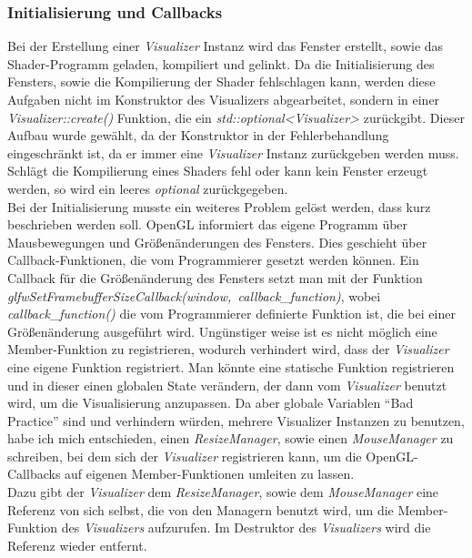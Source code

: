 \documentclass[11pt,a4paper]{article}
\begin{document}
\subsubsection*{Initialisierung und Callbacks}
Bei der Erstellung einer \mbox{\textit{Visualizer}} Instanz wird das Fenster erstellt, sowie das Shader-Programm geladen, kompiliert und gelinkt. Da die Initialisierung des Fensters, sowie die Kompilierung der Shader fehlschlagen kann, werden diese Aufgaben nicht im Konstruktor des Visualizers abgearbeitet, sondern in einer \mbox{\textit{Visualizer::create()}} Funktion, die ein \mbox{\textit{std::optional<Visualizer>}} zurückgibt. Dieser Aufbau wurde gewählt, da der Konstruktor in der Fehlerbehandlung eingeschränkt ist, da er immer eine \mbox{\textit{Visualizer}} Instanz zurückgeben werden muss. Schlägt die Kompilierung eines Shaders fehl oder kann kein Fenster erzeugt werden, so wird ein leeres \mbox{\textit{optional}} zurückgegeben.\\
Bei der Initialisierung musste ein weiteres Problem gelöst werden, dass kurz beschrieben werden soll. OpenGL informiert das eigene Programm über Mausbewegungen und Größenänderungen des Fensters. Dies geschieht über Callback-Funktionen, die vom Programmierer gesetzt werden können. Ein Callback für die Größenänderung des Fensters setzt man mit der Funktion \mbox{\textit{glfwSetFramebufferSizeCallback(window, callback\_function)}}, wobei \mbox{\textit{callback\_function()}} die vom Programmierer definierte Funktion ist, die bei einer Größenänderung ausgeführt wird. Ungünstiger weise ist es nicht möglich eine Member-Funktion zu registrieren, wodurch verhindert wird, dass der \mbox{\textit{Visualizer}} eine eigene Funktion registriert. Man könnte eine statische Funktion registrieren und in dieser einen globalen State verändern, der dann vom \mbox{\textit{Visualizer}} benutzt wird, um die Visualisierung anzupassen. Da aber globale Variablen ``Bad Practice'' sind und verhindern würden, mehrere Visualizer Instanzen zu benutzen, habe ich mich entschieden, einen \mbox{\textit{ResizeManager}}, sowie einen \mbox{\textit{MouseManager}} zu schreiben, bei dem sich der \mbox{\textit{Visualizer}} registrieren kann, um die OpenGL-Callbacks auf eigenen Member-Funktionen umleiten zu lassen.\\
Dazu gibt der \mbox{\textit{Visualizer}} dem \mbox{\textit{ResizeManager}}, sowie dem \mbox{\textit{MouseManager}} eine Referenz von sich selbst, die von den Managern benutzt wird, um die Member-Funktion des \mbox{\textit{Visualizers}} aufzurufen. Im Destruktor des \mbox{\textit{Visualizers}} wird die Referenz wieder entfernt.
\end{document}
